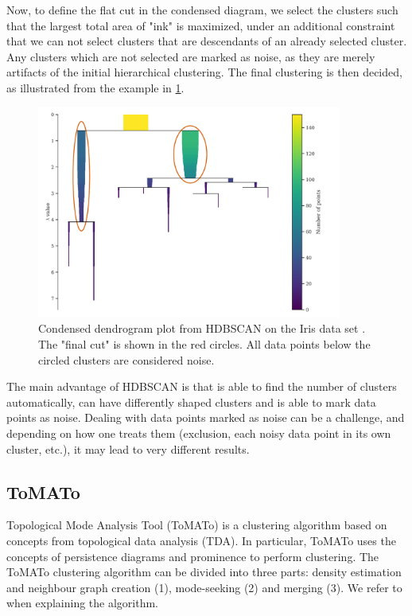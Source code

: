 Now, to define the flat cut in the condensed diagram, we select the clusters such that the largest total area of "ink" is maximized, under an additional constraint that we can not select clusters that are descendants of an already selected cluster. Any clusters which are not selected are marked as noise, as they are merely artifacts of the initial hierarchical clustering. The final clustering is then decided, as illustrated from the example in \cref{fig:hdbscan-condensed-dendrogram-final-cut-example}.
\begin{figure}[H]
    \centering
    \includegraphics[width=10cm]{thesis/figures/hdbscan-condensed-tree-final-cut-example.pdf}
    \caption{Condensed dendrogram plot from HDBSCAN on the Iris data set \cite{Fisher1936}. The "final cut" is shown in the red circles. All data points below the circled clusters are considered noise.}
    \label{fig:hdbscan-condensed-dendrogram-final-cut-example}
\end{figure}

The main advantage of HDBSCAN is that is able to find the number of clusters automatically, can have differently shaped clusters and is able to mark data points as noise. Dealing with data points marked as noise can be a challenge, and depending on how one treats them (exclusion, each noisy data point in its own cluster, etc.), it may lead to very different results.

\subsection{ToMATo}
\label{sec:tomato-clustering}
Topological Mode Analysis Tool (ToMATo) \cite[2. ToMATo]{Oudot2015} is a clustering algorithm based on concepts from topological data analysis (TDA). In particular, ToMATo uses the concepts of persistence diagrams and prominence to perform clustering. The ToMATo clustering algorithm can be divided into three parts: density estimation and neighbour graph creation (1), mode-seeking (2) and merging (3). We refer to \cite[2. ToMATo]{Oudot2015} when explaining the algorithm.

